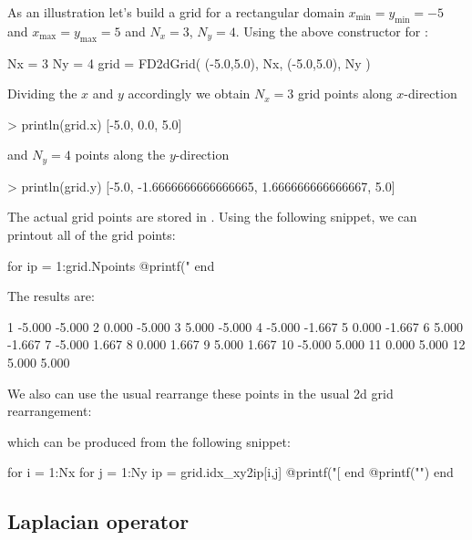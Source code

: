 As an illustration let's build a grid for a rectangular domain
$x_\mathrm{min} = y_{\mathrm{min}}=-5$ and $x_\mathrm{max} = y_{\mathrm{max}}=5$
and $N_{x}=3$, $N_{y}=4$.
Using the above constructor for :
\begin{juliacode}
Nx = 3
Ny = 4
grid = FD2dGrid( (-5.0,5.0), Nx, (-5.0,5.0), Ny )
\end{juliacode}
%
Dividing the $x$ and $y$ accordingly we obtain $N_{x}=3$
grid points along $x$-direction
%
\begin{textcode}
> println(grid.x)
[-5.0, 0.0, 5.0]
\end{textcode}
%
and $N_{y}=4$ points along the $y$-direction
\begin{textcode}
> println(grid.y)
[-5.0, -1.6666666666666665, 1.666666666666667, 5.0]
\end{textcode}
%
The actual grid points are stored in . Using the
following snippet, we can printout all of the grid points:
%
\begin{juliacode}
for ip = 1:grid.Npoints
    @printf("%
end
\end{juliacode}
%
The results are:
%
\begin{textcode}
  1   -5.000   -5.000
  2    0.000   -5.000
  3    5.000   -5.000
  4   -5.000   -1.667
  5    0.000   -1.667
  6    5.000   -1.667
  7   -5.000    1.667
  8    0.000    1.667
  9    5.000    1.667
 10   -5.000    5.000
 11    0.000    5.000
 12    5.000    5.000
\end{textcode}
%
We also can use the usual rearrange these points in the usual 2d grid rearrangement:
%
\begin{textcode}
[  -5.000,  -5.000] [  -5.000,  -1.667] [  -5.000,   1.667] [  -5.000,   5.000] 
[   0.000,  -5.000] [   0.000,  -1.667] [   0.000,   1.667] [   0.000,   5.000] 
[   5.000,  -5.000] [   5.000,  -1.667] [   5.000,   1.667] [   5.000,   5.000]
\end{textcode}
%
which can be produced from the following snippet:
%
\begin{juliacode}
for i = 1:Nx
    for j = 1:Ny
        ip = grid.idx_xy2ip[i,j]
        @printf("[%
    end
    @printf("\n")
end
\end{juliacode}



\subsection{Laplacian operator}

